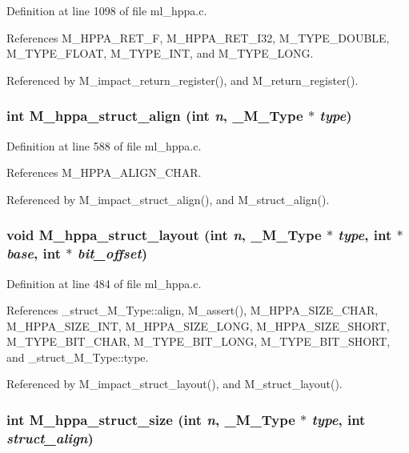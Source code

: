 Definition at line 1098 of file ml\_\-hppa.c.

References M\_\-HPPA\_\-RET\_\-F, M\_\-HPPA\_\-RET\_\-I32, M\_\-TYPE\_\-DOUBLE, M\_\-TYPE\_\-FLOAT, M\_\-TYPE\_\-INT, and M\_\-TYPE\_\-LONG.

Referenced by M\_\-impact\_\-return\_\-register(), and M\_\-return\_\-register().
\subsubsection{\setlength{\rightskip}{0pt plus 5cm}int M\_\-hppa\_\-struct\_\-align (int {\em n}, \bf{\_\-M\_\-Type} $\ast$ {\em type})}\label{ml__hppa_8c_6a52ac50752ae22b424b7c3bd7b28238}




Definition at line 588 of file ml\_\-hppa.c.

References M\_\-HPPA\_\-ALIGN\_\-CHAR.

Referenced by M\_\-impact\_\-struct\_\-align(), and M\_\-struct\_\-align().
\subsubsection{\setlength{\rightskip}{0pt plus 5cm}void M\_\-hppa\_\-struct\_\-layout (int {\em n}, \bf{\_\-M\_\-Type} $\ast$ {\em type}, int $\ast$ {\em base}, int $\ast$ {\em bit\_\-offset})}\label{ml__hppa_8c_7dd9ed529e079966472897bc4afa1f76}




Definition at line 484 of file ml\_\-hppa.c.

References \_\-struct\_\-M\_\-Type::align, M\_\-assert(), M\_\-HPPA\_\-SIZE\_\-CHAR, M\_\-HPPA\_\-SIZE\_\-INT, M\_\-HPPA\_\-SIZE\_\-LONG, M\_\-HPPA\_\-SIZE\_\-SHORT, M\_\-TYPE\_\-BIT\_\-CHAR, M\_\-TYPE\_\-BIT\_\-LONG, M\_\-TYPE\_\-BIT\_\-SHORT, and \_\-struct\_\-M\_\-Type::type.

Referenced by M\_\-impact\_\-struct\_\-layout(), and M\_\-struct\_\-layout().
\subsubsection{\setlength{\rightskip}{0pt plus 5cm}int M\_\-hppa\_\-struct\_\-size (int {\em n}, \bf{\_\-M\_\-Type} $\ast$ {\em type}, int {\em struct\_\-align})}\label{ml__hppa_8c_4ea35ed533f5fb0b57fe7591146ccb7f}




